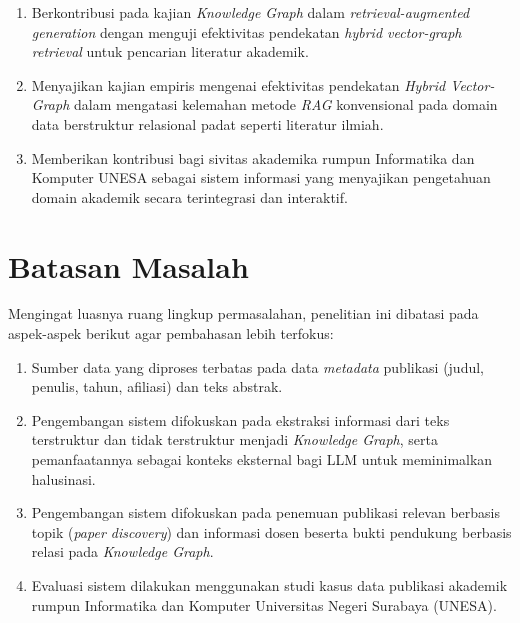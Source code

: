 \begin{enumerate}[label=\arabic*., leftmargin=0.75cm]
    \item Berkontribusi pada kajian \textit{Knowledge Graph} dalam \textit{retrieval-augmented generation} dengan menguji efektivitas pendekatan \textit{hybrid vector-graph retrieval} untuk pencarian literatur akademik.

    \item Menyajikan kajian empiris mengenai efektivitas pendekatan \textit{Hybrid Vector-Graph} dalam mengatasi kelemahan metode \textit{RAG} konvensional pada domain data berstruktur relasional padat seperti literatur ilmiah.

    \item Memberikan kontribusi bagi sivitas akademika rumpun Informatika dan Komputer UNESA sebagai sistem informasi yang menyajikan pengetahuan domain akademik secara terintegrasi dan interaktif.
\end{enumerate}

\section{Batasan Masalah}

Mengingat luasnya ruang lingkup permasalahan, penelitian ini dibatasi pada aspek-aspek berikut agar pembahasan lebih terfokus:

\begin{enumerate}[label=\arabic*., leftmargin=0.75cm]
    \item Sumber data yang diproses terbatas pada data \textit{metadata} publikasi (judul, penulis, tahun, afiliasi) dan teks abstrak.

    \item Pengembangan sistem difokuskan pada ekstraksi informasi dari teks terstruktur dan tidak terstruktur menjadi \textit{Knowledge Graph}, serta pemanfaatannya sebagai konteks eksternal bagi LLM untuk meminimalkan halusinasi.

    \item Pengembangan sistem difokuskan pada penemuan publikasi relevan berbasis topik (\textit{paper discovery}) dan informasi dosen beserta bukti pendukung berbasis relasi pada \textit{Knowledge Graph}.

    \item Evaluasi sistem dilakukan menggunakan studi kasus data publikasi akademik rumpun Informatika dan Komputer Universitas Negeri Surabaya (UNESA).
\end{enumerate}
